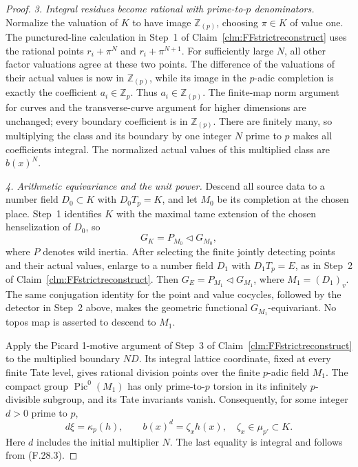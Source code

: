 \documentclass[11pt]{article}
\begin{document}
\begin{proof}
\emph{3. Integral residues become rational with prime-to-\(p\)
denominators.}
Normalize the valuation of \(K\) to have image
\(\mathbb Z_{(p)}\), choosing \(\pi\in K\)
of value one. The punctured-line calculation in
Step~1 of Claim~\ref{clm:FFstrictreconstruct}
uses the rational points \(r_i+\pi^N\) and
\(r_i+\pi^{N+1}\). For sufficiently large \(N\),
all other factor valuations agree at these two
points. The difference of the valuations of their
actual values is now in \(\mathbb Z_{(p)}\),
while its image in the \(p\)-adic completion is
exactly the coefficient \(a_i\in\mathbb Z_p\).
Thus \(a_i\in\mathbb Z_{(p)}\).
The finite-map norm argument for curves and the
transverse-curve argument for higher dimensions
are unchanged; every boundary coefficient is
in \(\mathbb Z_{(p)}\). There are finitely many,
so multiplying the class and its boundary by
one integer \(N\) prime to \(p\) makes all
coefficients integral. The normalized actual
values of this multiplied class are \(b(x)^N\).

\emph{4. Arithmetic equivariance and the unit power.}
Descend all source data to a number field
\(D_0\subset K\) with \(D_0T_p=K\), and let
\(M_0\) be its completion at the chosen place.
Step~1 identifies \(K\) with the maximal tame
extension of the chosen henselization of \(D_0\), so
\[
            G_K=P_{M_0}\triangleleft G_{M_0},          \tag{F.28.4}
\]
where \(P\) denotes wild inertia. After selecting
the finite jointly detecting points and their
actual values, enlarge to a number field \(D_1\)
with \(D_1T_p=E\), as in Step~2 of
Claim~\ref{clm:FFstrictreconstruct}. Then
\(G_E=P_{M_1}\triangleleft G_{M_1}\), where
\(M_1=(D_1)_v\). The same conjugation identity
for the point and value cocycles, followed by
the detector in Step~2 above, makes the geometric
functional \(G_{M_1}\)-equivariant. No topos
map is asserted to descend to \(M_1\).

Apply the Picard 1-motive argument of Step~3 of
Claim~\ref{clm:FFstrictreconstruct} to the
multiplied boundary \(ND\). Its integral lattice
coordinate, fixed at every finite Tate level,
gives rational division points over the finite
\(p\)-adic field \(M_1\). The compact group
\(\operatorname{Pic}^0(M_1)\) has only prime-to-\(p\)
torsion in its infinitely \(p\)-divisible subgroup,
and its Tate invariants vanish. Consequently, for
some integer \(d>0\) prime to \(p\),
\[
              d\xi=\kappa_p(h),\qquad
              b(x)^d=\zeta_x h(x),\quad
              \zeta_x\in\mu_{p'}\subset K.            \tag{F.28.5}
\]
Here \(d\) includes the initial multiplier \(N\).
The last equality is integral and follows from
(F.28.3).


\end{proof}
\end{document}
